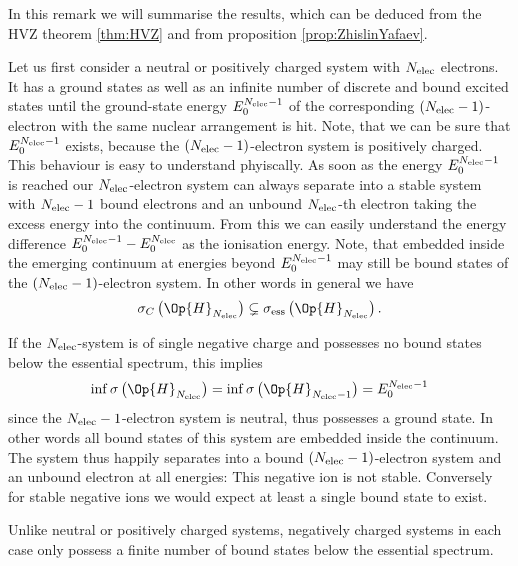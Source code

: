 \begin{rem}
	In this remark we will summarise the results,
	which can be deduced from the HVZ theorem \vref{thm:HVZ}
	and from proposition \vref{prop:ZhislinYafaev}.

	Let us first consider a neutral or positively charged
	system with $N_\text{elec}$ electrons.
	It has a ground states as well as an infinite number
	of discrete and bound excited states
	until the ground-state energy $E^{N_\text{elec}-1}_0$
	of the corresponding $(N_\text{elec}-1)$-electron
	with the same nuclear arrangement is hit.
	Note, that we can be sure that $E^{N_\text{elec}-1}_0$
	exists, because the $(N_\text{elec}-1)$-electron system
	is positively charged.
	This behaviour is easy to understand phyiscally.
	As soon as the energy $E^{N_\text{elec}-1}_0$ is reached
	our $N_\text{elec}$-electron system can always
	separate into a stable system with $N_\text{elec}-1$
	bound electrons and an unbound $N_\text{elec}$-th electron
	taking the excess energy into the continuum.
	From this we can easily understand the energy difference
	$E^{N_\text{elec}-1}_0 - E^{N_\text{elec}}_0$
	as the ionisation energy.
	Note, that embedded inside the emerging continuum
	at energies beyond $E^{N_\text{elec}-1}_0$
	may still be bound states of the $(N_\text{elec}-1)$-electron system.
	In other words in general we have
	\[ \sigma_C\left(\Op{H}_{\Nelec}\right)
		\subsetneq \sigma_\text{ess}\left(\Op{H}_{\Nelec}\right). \]

	If the $N_\text{elec}$-system is of single negative charge
	and possesses no bound states below the essential spectrum,
	this implies
	\[ \inf \sigma\left(\Op{H}_{\Nelec}\right)
		= \inf \sigma\left(\Op{H}_{\Nelec-1}\right) = E^{\Nelec-1}_0 \]
	since the $N_\text{elec}-1$-electron system is neutral,
	thus possesses a ground state.
	In other words all bound states of this system
	are embedded inside the continuum.
	The system thus happily separates into a bound $(N_\text{elec}-1)$-electron system
	and an unbound electron at all energies:
	This negative ion is not stable.
	Conversely for stable negative ions
	we would expect at least a single bound state to exist.

	Unlike neutral or positively charged systems,
	negatively charged systems in each case only possess a
	finite number of bound states below
	the essential spectrum.


\end{rem}
